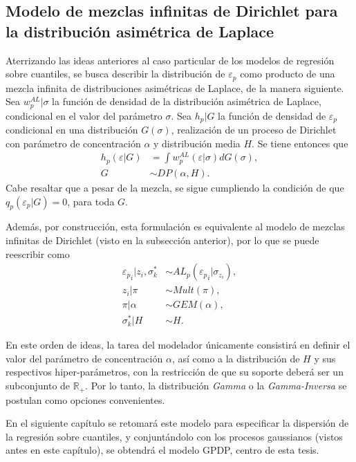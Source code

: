 \subsection{Modelo de mezclas infinitas de Dirichlet para la distribuci\'on asim\'etrica de Laplace}

Aterrizando las ideas anteriores al caso particular de los modelos de regresi\'on sobre cuantiles, se busca describir la distribuci\'on de $\varepsilon_p$ como producto de una mezcla infinita de distribuciones asim\'etricas de Laplace, de la manera siguiente. Sea $w_p^{AL} | \sigma$ la funci\'on de densidad de la distribuci\'on asim\'etrica de Laplace, condicional en el valor del par\'ametro $\sigma$. Sea $h_p|G$ la funci\'on de densidad de $\varepsilon_p$ condicional en una distribuci\'on $G(\sigma)$, realizaci\'on de un proceso de Dirichlet con par\'ametro de concentraci\'on $\alpha$ y distribuci\'on media $H$. Se tiene entonces que
\begin{equation*}
\begin{aligned}
    h_p(\varepsilon|G) &= \int w_p^{AL}(\varepsilon|\sigma)dG(\sigma), \\
    G &\sim DP(\alpha,H).
\end{aligned}
\end{equation*}
Cabe resaltar que a pesar de la mezcla, se sigue cumpliendo la condici\'on de que $q_p(\varepsilon_p|G) = 0$, para toda $G$.

Adem\'as, por construcci\'on, esta formulaci\'on es equivalente al modelo de mezclas infinitas de Dirichlet (visto en la subsecci\'on anterior), por lo que se puede reescribir como
\begin{equation*}
\begin{aligned}
   {\varepsilon_p}_i | z_i, \sigma_k^* &\sim AL_p({\varepsilon_p}_i | \sigma_{z_i}), \\
   z_i | \pi &\sim Mult(\pi), \\
   \pi | \alpha &\sim GEM(\alpha), \\
   \sigma_k^* | H &\sim H.
\end{aligned}
\end{equation*}

En este orden de ideas, la tarea del modelador \'unicamente consistir\'a en definir el valor del par\'ametro de concentraci\'on $\alpha$, as\'i como a la distribuci\'on de $H$ y sus respectivos hiper-par\'ametros, con la restricci\'on de que su soporte deber\'a ser un subconjunto de $\mathbb{R}_+$. Por lo tanto, la distribuci\'on \textit{Gamma} o la \textit{Gamma-Inversa} se postulan como opciones convenientes.

En el siguiente cap\'itulo se retomar\'a este modelo para especificar la dispersi\'on de la regresi\'on sobre cuantiles, y conjunt\'andolo con los procesos gaussianos (vistos antes en este cap\'itulo), se obtendr\'a el modelo GPDP, centro de esta tesis.

\newpage